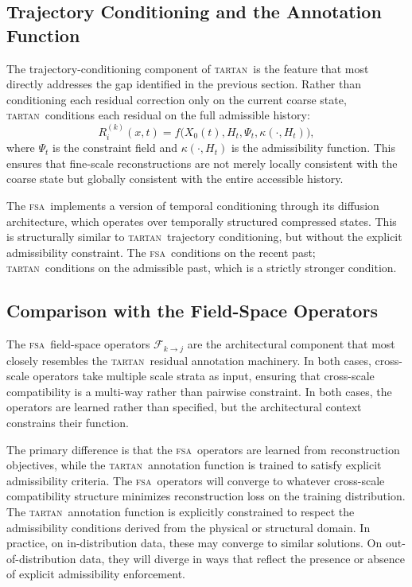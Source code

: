 \documentclass[11pt,a4paper]{article}
\theoremstyle{plain}
\theoremstyle{definition}
\theoremstyle{remark}
\newcommand{\TARTAN}{\textup{\textsc{tartan}}}
\newcommand{\FSA}{\textup{\textsc{fsa}}}
\begin{document}
\subsection{Trajectory Conditioning and the Annotation Function}

The trajectory-conditioning component of \TARTAN\ is the feature that most
directly addresses the gap identified in the previous section. Rather than
conditioning each residual correction only on the current coarse state,
\TARTAN\ conditions each residual on the full admissible history:
\[
R_i^{(k)}(x, t) = f\bigl(X_0(t), H_t, \Psi_t, \kappa(\cdot, H_t)\bigr),
\]
where $\Psi_t$ is the constraint field and $\kappa(\cdot, H_t)$ is the
admissibility function. This ensures that fine-scale reconstructions are
not merely locally consistent with the coarse state but globally consistent
with the entire accessible history.

The \FSA\ implements a version of temporal conditioning through its
diffusion architecture, which operates over temporally structured compressed
states. This is structurally similar to \TARTAN\ trajectory conditioning,
but without the explicit admissibility constraint. The \FSA\ conditions on
the recent past; \TARTAN\ conditions on the admissible past, which is a
strictly stronger condition.

\subsection{Comparison with the Field-Space Operators}

The \FSA\ field-space operators $\mathcal{F}_{k \to j}$ are the
architectural component that most closely resembles the \TARTAN\ residual
annotation machinery. In both cases, cross-scale operators take multiple
scale strata as input, ensuring that cross-scale compatibility is a
multi-way rather than pairwise constraint. In both cases, the operators
are learned rather than specified, but the architectural context constrains
their function.

The primary difference is that the \FSA\ operators are learned from
reconstruction objectives, while the \TARTAN\ annotation function is
trained to satisfy explicit admissibility criteria. The \FSA\ operators
will converge to whatever cross-scale compatibility structure minimizes
reconstruction loss on the training distribution. The \TARTAN\ annotation
function is explicitly constrained to respect the admissibility conditions
derived from the physical or structural domain. In practice, on
in-distribution data, these may converge to similar solutions. On
out-of-distribution data, they will diverge in ways that reflect the
presence or absence of explicit admissibility enforcement.
\end{document}
